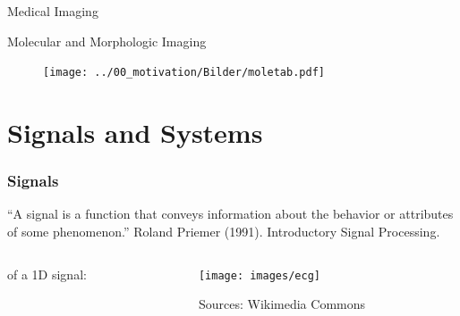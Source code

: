 \begin{frame}[c]{Medical Imaging}
\end{frame}




\begin{frame}[c]{Molecular and Morphologic Imaging}
    \begin{figure}
        \texttt{[image: ../00\_motivation/Bilder/moletab.pdf]}
    \end{figure}
\end{frame}




\section{Signals and Systems} %


\begin{frame}

    \frametitle{Signals}
    \begin{myDefinition}
        ``A signal is a function that conveys information about the behavior or attributes of some phenomenon.''\quad
        {\scriptsize
            Roland Priemer (1991). Introductory Signal Processing.
        }
    \end{myDefinition}
    \begin{columns}[c, onlytextwidth]
        \begin{column}{0.4\textwidth}
            \myExample{} of a 1D signal:
        \end{column}\begin{column}{0.6\textwidth}
            \texttt{[image: images/ecg]}
            \begin{flushright}
                \scriptsize Sources: Wikimedia Commons
            \end{flushright}
        \end{column}
    \end{columns}

\end{frame}


